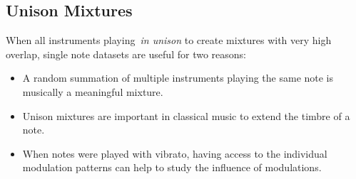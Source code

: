\subsection{Unison Mixtures}
\label{sec:scenario}


When all instruments playing~\emph{in unison} to create mixtures with very high overlap, single note datasets are useful for two reasons:

\begin{itemize}
  \item A random summation of multiple instruments playing the same note is musically a meaningful mixture.
  \item Unison mixtures are important in classical music to extend the timbre of a note.
  \item When notes were played with vibrato, having access to the individual modulation patterns can help to study the influence of modulations.
\end{itemize}




